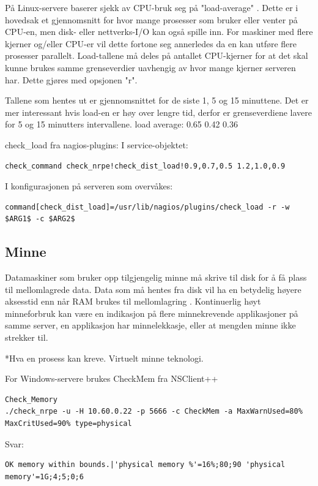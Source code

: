 På Linux-servere baserer sjekk av CPU-bruk seg på "load-average" \cite{loadavg} \cite{wiki:loadavg}. Dette er i hovedsak et gjennomsnitt for hvor mange prosesser som bruker eller venter på CPU-en, men disk- eller nettverks-I/O kan også spille inn. For maskiner med flere kjerner og/eller CPU-er vil dette fortone seg annerledes da en kan utføre flere prosesser parallelt. Load-tallene må deles på antallet CPU-kjerner for at det skal kunne brukes samme grenseverdier uavhengig av hvor mange kjerner serveren har. Dette gjøres med opsjonen "r".

Tallene som hentes ut er gjennomsnittet for de siste 1, 5 og 15 minuttene. Det er mer interessant hvis load-en er høy over lengre tid, derfor er grenseverdiene lavere for 5 og 15 minutters intervallene.
load average: 0.65 0.42 0.36

check\_load fra nagios-plugins:
I service-objektet:
\begin{lstlisting}[style=example]
check_command check_nrpe!check_dist_load!0.9,0.7,0.5 1.2,1.0,0.9
\end{lstlisting}
I konfigurasjonen på serveren som overvåkes:
\begin{lstlisting}[style=example]
command[check_dist_load]=/usr/lib/nagios/plugins/check_load -r -w $ARG1$ -c $ARG2$
\end{lstlisting}

\subsection{Minne}
Datamaskiner som bruker opp tilgjengelig minne må skrive til disk for å få plass til mellomlagrede data. Data som må hentes fra disk vil ha en betydelig høyere aksesstid enn når RAM brukes til mellomlagring \cite{wiki:mem}. 
Kontinuerlig høyt minneforbruk kan være en indikasjon på flere minnekrevende applikasjoner på samme server, en applikasjon har minnelekkasje, eller at mengden minne ikke strekker til.

*Hva en prosess kan kreve. Virtuelt minne teknologi.

For Windows-servere brukes CheckMem fra NSClient++
\begin{lstlisting}[style=example]
Check_Memory
./check_nrpe -u -H 10.60.0.22 -p 5666 -c CheckMem -a MaxWarnUsed=80% MaxCritUsed=90% type=physical
\end{lstlisting}
Svar:
\begin{lstlisting}
OK memory within bounds.|'physical memory %'=16%;80;90 'physical memory'=1G;4;5;0;6
\end{lstlisting}

